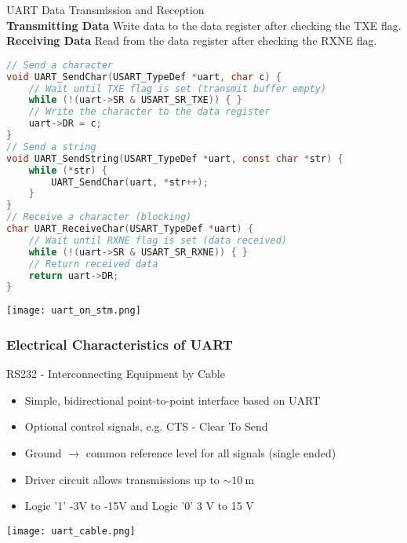 \begin{KR}{UART Data Transmission and Reception}\\
\textbf{Transmitting Data}
Write data to the data register after checking the TXE flag.\\
\textbf{Receiving Data}
Read from the data register after checking the RXNE flag.

\begin{lstlisting}[language=C, style=basesmol]
// Send a character
void UART_SendChar(USART_TypeDef *uart, char c) {
    // Wait until TXE flag is set (transmit buffer empty)
    while (!(uart->SR & USART_SR_TXE)) { }
    // Write the character to the data register
    uart->DR = c;
}
// Send a string
void UART_SendString(USART_TypeDef *uart, const char *str) {
    while (*str) {
        UART_SendChar(uart, *str++);
    }
}
// Receive a character (blocking)
char UART_ReceiveChar(USART_TypeDef *uart) {
    // Wait until RXNE flag is set (data received)
    while (!(uart->SR & USART_SR_RXNE)) { }
    // Return received data
    return uart->DR;
}
\end{lstlisting}
\end{KR}

\texttt{[image: uart\_on\_stm.png]}




\raggedcolumns
\columnbreak
\subsubsection{Electrical Characteristics of UART}

\begin{definition}{RS232 - Interconnecting Equipment by Cable}

    \begin{minipage}{0.7\linewidth}
        \begin{itemize}
            \item Simple, bidirectional point-to-point interface based on UART
            \item Optional control signals, e.g. CTS - Clear To Send
            \item Ground $\rightarrow$ common reference level for all signals (single ended)
            \item Driver circuit allows transmissions up to $\sim 10 \mathrm{~m}$
            \item Logic '1' -3V to -15V and Logic '0' 3 V to 15 V
        \end{itemize}
    \end{minipage}
    \begin{minipage}{0.3\linewidth}
    \texttt{[image: uart\_cable.png]}
    \end{minipage}
    
\end{definition}



